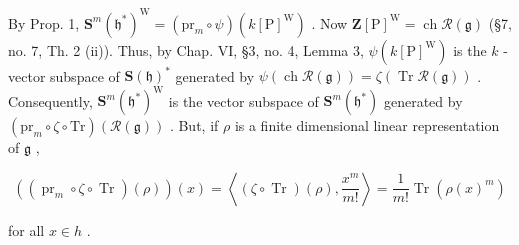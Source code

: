 By Prop. 1, \(\mathbf{S}^m (\mathfrak{h}^*)^{\mathrm{W}} = (\mathrm{pr}_m\circ \psi)(k[\mathrm{P}]^{\mathrm{W}})\) . Now \(\mathbf{Z}[\mathrm{P}]^{\mathrm{W}} = \operatorname {ch}\mathcal{R}(\mathfrak{g})\) (§7, no. 7, Th. 2 (ii)). Thus, by Chap. VI, §3, no. 4, Lemma 3, \(\psi (k[\mathrm{P}]^{\mathrm{W}})\) is the \(k\) -vector subspace of \(\mathbf{S}(\mathfrak{h})^{*}\) generated by \(\psi (\operatorname {ch}\mathcal{R}(\mathfrak{g})) = \zeta (\operatorname {Tr}\mathcal{R}(\mathfrak{g}))\) . Consequently, \(\mathbf{S}^m (\mathfrak{h}^*)^{\mathrm{W}}\) is the vector subspace of \(\mathbf{S}^m (\mathfrak{h}^*)\) generated by \((\mathrm{pr}_m\circ \zeta \circ \mathrm{Tr})(\mathcal{R}(\mathfrak{g}))\) . But, if \(\rho\) is a finite dimensional linear representation of \(\mathfrak{g}\) ,

\[
((\operatorname{pr} _ {m} \circ \zeta \circ \operatorname{Tr}) (\rho)) (x) = \left\langle (\zeta \circ \operatorname{Tr}) (\rho), \frac {x ^ {m}}{m !} \right\rangle = \frac {1}{m !} \operatorname{Tr} (\rho (x) ^ {m})
\]

for all \(x \in h\) .

